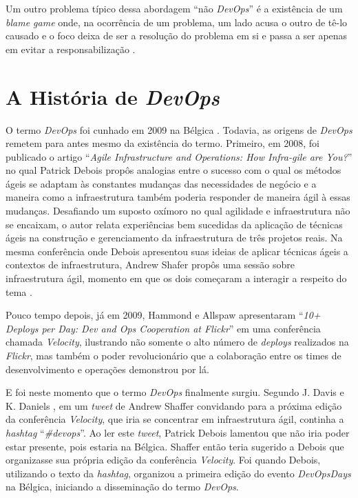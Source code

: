 Um outro problema típico dessa abordagem ``não \textit{DevOps}'' é a existência
de um \textit{blame game} onde, na ocorrência de um problema, um lado acusa
o outro de tê-lo causado e o foco deixa de ser a resolução do problema em si
e passa a ser apenas em evitar a responsabilização \cite{toward_unified_model}.

\section{A História de \textit{DevOps}}\label{secao_historico_devops}

O termo \textit{DevOps} foi cunhado em 2009 na Bélgica \cite{devops_for_developers}.
Todavia, as origens de \textit{DevOps} remetem para antes mesmo da existência
do termo. Primeiro, em 2008, foi publicado o artigo ``\textit{Agile
Infrastructure and Operations: How Infra-gile are You?}''
\cite{agile_infra_operations} no qual
Patrick Debois propôs analogias entre o sucesso com o qual os métodos ágeis
se adaptam às constantes mudanças das necessidades de negócio e a maneira como
a infraestrutura também poderia responder de maneira ágil à essas mudanças.
Desafiando um suposto oxímoro no qual agilidade e infraestrutura não
se encaixam, o autor relata experiências bem sucedidas da aplicação de técnicas
ágeis na construção e gerenciamento da infraestrutura de três projetos reais.
Na mesma conferência onde Debois apresentou suas ideias de aplicar técnicas
ágeis a contextos de infraestrutura, Andrew Shafer propôs uma sessão sobre
infraestrutura ágil, momento em que os dois começaram a interagir a respeito do
tema \cite{effective_devops}.

Pouco tempo depois, já em 2009, Hammond e Allspaw apresentaram ``\textit{10+ Deploys
per Day: Dev and Ops Cooperation at Flickr}'' \cite{flickr} em uma conferência
chamada \textit{Velocity}, ilustrando não somente o alto número de
\textit{deploys} realizados na \textit{Flickr}, mas também o poder
revolucionário que a colaboração entre os times de desenvolvimento e operações
demonstrou por lá.

E foi neste momento que o termo \textit{DevOps} finalmente surgiu. Segundo
J. Davis e K. Daniels \cite{effective_devops}, em um \textit{tweet} de Andrew
Shaffer convidando para a próxima edição da conferência \textit{Velocity}, que
iria se concentrar em infraestrutura ágil, continha a \textit{hashtag}
``\textit{\#devops}''. Ao ler este \textit{tweet}, Patrick Debois lamentou que
não iria poder estar presente, pois estaria na Bélgica. Shaffer então teria
sugerido a Debois que organizasse sua própria edição da conferência
\textit{Velocity}. Foi quando Debois, utilizando o texto da \textit{hashtag},
organizou a primeira edição do evento \textit{DevOpsDays} na Bélgica,
iniciando a disseminação do termo \textit{DevOps}.

